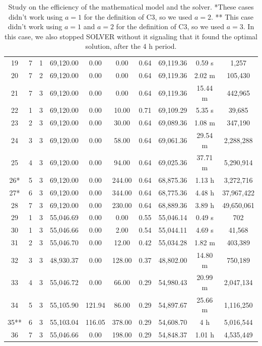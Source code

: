 \documentclass{singlecol}
\theoremstyle{TH}{
\newtheorem{lemma}{Lemma}
\newtheorem{theorem}[lemma]{Theorem}
\newtheorem{corrolary}[lemma]{Corrolary}
\newtheorem{conjecture}[lemma]{Conjecture}
\newtheorem{proposition}[lemma]{Proposition}
\newtheorem{claim}[lemma]{Claim}
\newtheorem{stheorem}[lemma]{Wrong Theorem}
\newtheorem{algorithm}{Algorithm}
}
\theoremstyle{THrm}{
\newtheorem{definition}{Definition}[section]
\newtheorem{question}{Question}[section]
\newtheorem{remark}{Remark}
\newtheorem{scheme}{Scheme}
}
\theoremstyle{THhit}{
\newtheorem{case}{Case}[section]
}
\begin{document}
\begin{table}[h!]
\begin{center}
\begin{small}
\begin{tabular}{ c c c c c c c c c c }
	 19  &  7 & 1  & 69,120.00  &  0.00  & 0.00 &  0.64  &   69,119.36  & 0.59 s & 1,257 \\
	 20  &  7 & 2  & 69,120.00 &  0.00 & 0.00 &  0.64 & 69,119.36 & 2.02 m & 105,430 \\
	 21  &  7 & 3  & 69,120.00 &  0.00  & 0.00 &  0.64  & 69,119.36 & 15.44 m & 442,965 \\
     22  &  1 & 3  & 69,120.00 &  0.00  & 10.00 &  0.71 &   69,109.29  & 5.35 s & 39,685 \\
	 23  &  2 & 3  & 69,120.00 &  0.00 & 30.00 &  0.64 &   69,089.36 & 1.08 m & 347,190 \\
	 24  & 3 & 3  & 69,120.00 &  0.00  & 58.00 & 0.64 &   69,061.36  & 29.54 m & 2,288,288 \\
	 25  & 4 & 3  & 69,120.00  &  0.00  & 94.00 &  0.64 &   69,025.36  & 37.71 m & 5,290,914 \\
     26*  & 5 & 3  & 69,120.00 &  0.00  & 244.00 &  0.64 &   68,875.36  & 1.13 h & 3,272,716 \\
	 27*  & 6 & 3  & 69,120.00 &  0.00 & 344.00 &  0.64   &   68,775.36  & 4.48 h & 37,967,422 \\
	 28  & 7 & 3  & 69,120.00  &  0.00  & 230.00 &  0.64 &   68,889.36  & 3.89 h & 49,650,061 \\
	 29  & 1 & 3  & 55,046.69  &  0.00  & 0.00 & 0.55 & 55,046.14  & 0.49 s & 702 \\
	 30  & 1 & 3  & 55,046.66  &  0.00 & 2.00 &  0.54   &   55,044.11  & 4.69 s & 41,568\\
	 31  & 2 & 3  & 55,046.70  &  0.00 & 12.00 &  0.42   &   55,034.28  & 1.82 m & 403,389 \\
	 32  & 3 & 3  & 48,930.37  & 0.00 & 128.00 &  0.37   &   48,802.00  & 14.80 m & 750,189 \\
	 33  & 4 & 3  & 55,046.72 &  0.00 & 66.00 &  0.29   &   54,980.43  & 20.99 m & 2,047,134 \\
	 34  & 5 & 3  & 55,105.90  &  121.94  & 86.00 &  0.29   &   54,897.67  & 25.66 m & 1,116,250 \\
	 35**  & 6 & 3  & 55,103.04  &  116.05  & 378.00 &  0.29   &   54,608.70  & 4 h & 5,016,544 \\
	 36  & 7 & 3  & 55,046.66  &  0.00  & 198.00 &  0.29   &   54,848.37  & 1.01 h & 4,535,449 \\
	\end{tabular}
\caption{Study on the efficiency of the mathematical model and the solver. *These cases didn't work using $a=1$ for the definition of C3, so we used $a=2$. ** This case didn't work using $a=1$ and $a=2$ for the definition of C3, so we used $a=3$. In this case, we also stopped SOLVER without it signaling that it found the optimal solution, after the 4 h period.}
\label{tab:lingoEvaluation}
\end{small}
\end{center}
\end{table}
\end{document}
